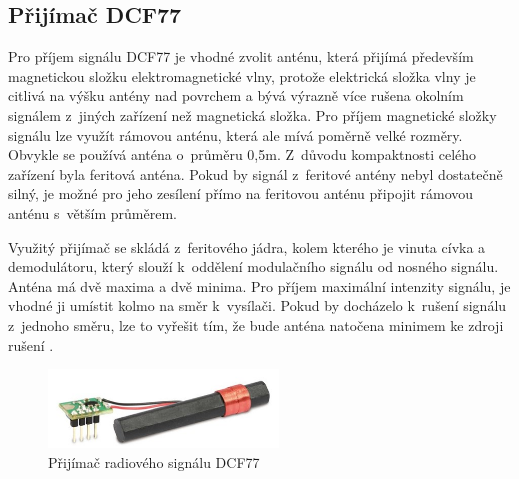 \subsection{Přijímač DCF77}
Pro příjem signálu DCF77 je vhodné zvolit anténu, která přijímá především magnetickou složku elektromagnetické vlny, protože elektrická složka vlny je citlivá na výšku antény nad povrchem a bývá výrazně více rušena okolním signálem z~jiných  zařízení než magnetická složka. Pro příjem magnetické složky signálu lze využít rámovou anténu, která ale mívá poměrně velké rozměry. Obvykle se používá anténa o~průměru 0,5m. Z~důvodu kompaktnosti celého zařízení byla  feritová anténa. Pokud by signál z~feritové antény nebyl dostatečně silný, je možné pro jeho zesílení přímo na feritovou anténu připojit rámovou anténu s~větším průměrem.

Využitý přijímač se skládá z~feritového jádra, kolem kterého je vinuta cívka a demodulátoru, který slouží k~oddělení modulačního signálu od nosného signálu. Anténa má dvě maxima a dvě minima. Pro příjem maximální intenzity signálu, je vhodné ji umístit kolmo na směr k~vysílači. Pokud by docházelo k~rušení signálu z~jednoho směru, lze to vyřešit tím, že bude anténa natočena minimem ke zdroji rušení \cite{fel_dcf77} \cite{vyvoj_hw_andel}.

\begin{figure}[H]
	\centering
	\includegraphics[width=6.1cm]{images/komponenty/DCF77_reciever.jpg}
	\caption{Přijímač radiového signálu DCF77 \cite{dratek_web}}
\end{figure}


